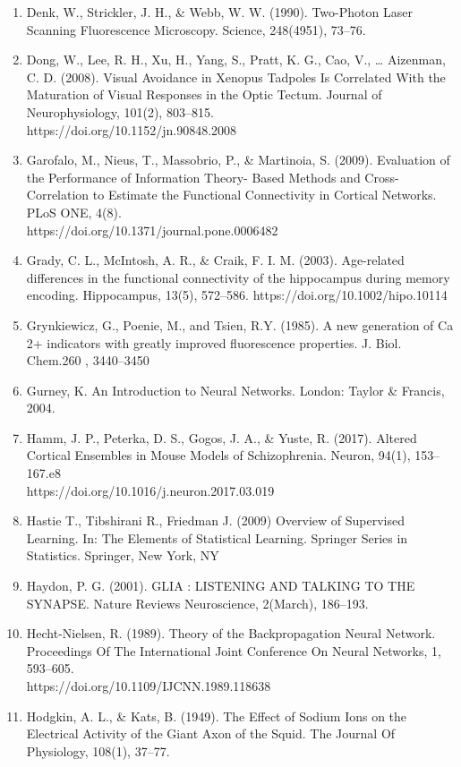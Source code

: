 \documentclass[11pt]{article}
\begin{document}
\begin{enumerate}
\item Denk, W., Strickler, J. H., \& Webb, W. W. (1990). Two-Photon Laser Scanning Fluorescence Microscopy. Science, 248(4951), 73–76.
\item Dong, W., Lee, R. H., Xu, H., Yang, S., Pratt, K. G., Cao, V., … Aizenman, C. D. (2008). Visual Avoidance in Xenopus Tadpoles Is Correlated With the Maturation of Visual Responses in the Optic Tectum. Journal of Neurophysiology, 101(2), 803–815.\\https://doi.org/10.1152/jn.90848.2008
\item Garofalo, M., Nieus, T., Massobrio, P., \& Martinoia, S. (2009). Evaluation of the Performance of Information Theory- Based Methods and Cross-Correlation to Estimate the Functional Connectivity in Cortical Networks. PLoS ONE, 4(8).\\https://doi.org/10.1371/journal.pone.0006482
\item Grady, C. L., McIntosh, A. R., \& Craik, F. I. M. (2003). Age-related differences in the functional connectivity of the hippocampus during memory encoding. Hippocampus, 13(5), 572–586. https://doi.org/10.1002/hipo.10114
\item Grynkiewicz, G., Poenie, M., and Tsien, R.Y. (1985). A new generation of Ca 2+ indicators with greatly improved fluorescence properties. J. Biol. Chem.260 , 3440–3450
\item Gurney, K. An Introduction to Neural Networks. London: Taylor \& Francis, 2004.
\item Hamm, J. P., Peterka, D. S., Gogos, J. A., \& Yuste, R. (2017). Altered Cortical Ensembles in Mouse Models of Schizophrenia. Neuron, 94(1), 153–167.e8\\https://doi.org/10.1016/j.neuron.2017.03.019
\item Hastie T., Tibshirani R., Friedman J. (2009) Overview of Supervised Learning. In: The Elements of Statistical Learning. Springer Series in Statistics. Springer, New York, NY
\item Haydon, P. G. (2001). GLIA : LISTENING AND TALKING TO THE SYNAPSE. Nature Reviews Neuroscience, 2(March), 186–193.
\item Hecht-Nielsen, R. (1989). Theory of the Backpropagation Neural Network. Proceedings Of The International Joint Conference On Neural Networks, 1, 593–605.\\https://doi.org/10.1109/IJCNN.1989.118638
\item Hodgkin, A. L., \& Kats, B. (1949). The Effect of Sodium Ions on the Electrical Activity of the Giant Axon of the Squid. The Journal Of Physiology, 108(1), 37–77.

\end{enumerate}
\end{document}
